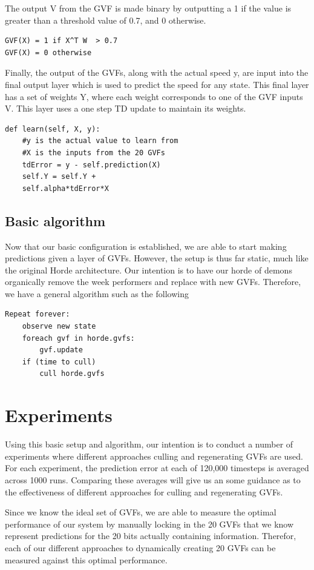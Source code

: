 \documentclass[letterpaper]{article}
\begin{document}
The output V from the GVF is made binary by outputting a 1 if the value is greater than a threshold value of 0.7, and 0 otherwise. 

\begin{lstlisting}
GVF(X) = 1 if X^T W  > 0.7
GVF(X) = 0 otherwise
\end{lstlisting}

Finally, the output of the GVFs, along with the actual speed y, are input into the final output layer which is used to predict the speed for any state. This final layer has a set of weights Y, where each weight corresponds to one of the GVF inputs V. This layer uses a one step TD update to maintain its weights.

\begin{lstlisting}
def learn(self, X, y):
    #y is the actual value to learn from
    #X is the inputs from the 20 GVFs
    tdError = y - self.prediction(X)
    self.Y = self.Y + 
    self.alpha*tdError*X
\end{lstlisting}

\subsection{Basic algorithm}
Now that our basic configuration is established, we are able to start making predictions given a layer of GVFs. However, the setup is thus far static, much like the original Horde architecture. Our intention is to have our horde of demons organically remove the week performers and replace with new GVFs. Therefore, we have a general algorithm such as the following 
\begin{lstlisting}
Repeat forever:
	observe new state
	foreach gvf in horde.gvfs:
		gvf.update
	if (time to cull)
		cull horde.gvfs
\end{lstlisting}	

\section{Experiments}
Using this basic setup and algorithm, our intention is to conduct a number of experiments where different approaches culling and regenerating GVFs are used. For each experiment, the prediction error at each of 120,000 timesteps is averaged across 1000 runs. Comparing these averages will give us an some guidance as to the effectiveness of different approaches for culling and regenerating GVFs. 

Since we know the ideal set of GVFs, we are able to measure the optimal performance of our system by manually locking in the 20 GVFs that we know represent predictions for the 20 bits actually containing information. Therefor, each of our different approaches to dynamically creating 20 GVFs can be measured against this optimal performance.
\end{document}
